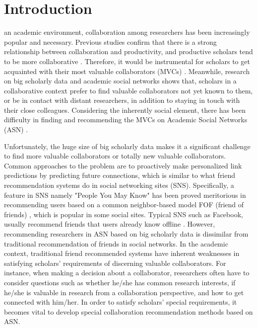 \documentclass[10pt,journal,compsoc]{IEEEtran}
\begin{document}
\maketitle

\IEEEdisplaynotcompsoctitleabstractindextext
\IEEEpeerreviewmaketitle



\section{Introduction}
 an academic environment, collaboration among researchers has been increasingly popular and necessary. Previous studies confirm that there is a strong relationship between collaboration and productivity, and productive scholars tend to be more collaborative \cite{Katz:what, Lee:impact}. Therefore, it would be instrumental for scholars to get acquainted with their most valuable collaborators (MVCs) \cite{Chen:CollabSeer}. Meanwhile, research on big scholarly data and academic social networks \cite{Tang:arnetminer, Tang:cross-domain} shows that, scholars in a collaborative context prefer to find valuable collaborators not yet known to them, or be in contact with distant researchers, in addition to staying in touch with their close colleagues. Considering the inherently social element, there has been difficulty in finding and recommending the MVCs on Academic Social Networks (ASN) \cite{lopes2010collaboration}.

Unfortunately, the huge size of big scholarly data makes it a significant challenge to find more valuable collaborators or totally new valuable collaborators. Common approaches to the problem are to proactively make personalized link predictions by predicting future connections, which is similar to what friend recommendation systems do in social networking sites (SNS). Specifically, a feature in SNS namely "People You May Know" has been proved meritorious in recommending users based on a common neighbor-based model FOF (friend of friends) \cite{Herlocker:analysis, Toscher:improved}, which is popular in some social sites. Typical SNS such as Facebook, usually recommend friends that users already know offline \cite{Boyd:social}. However, recommending researchers in ASN based on big scholarly data is dissimilar from traditional recommendation of friends in social networks. In the academic context, traditional friend recommended systems have inherent weaknesses in satisfying scholars' requirements of discerning valuable collaborators. For instance, when making a decision about a collaborator, researchers often have to consider questions such as whether he/she has common research interests, if he/she is valuable in research from a collaboration perspective, and how to get connected with him/her. In order to satisfy scholars' special requirements, it becomes vital to develop special collaboration recommendation methods based on ASN.
\end{document}
